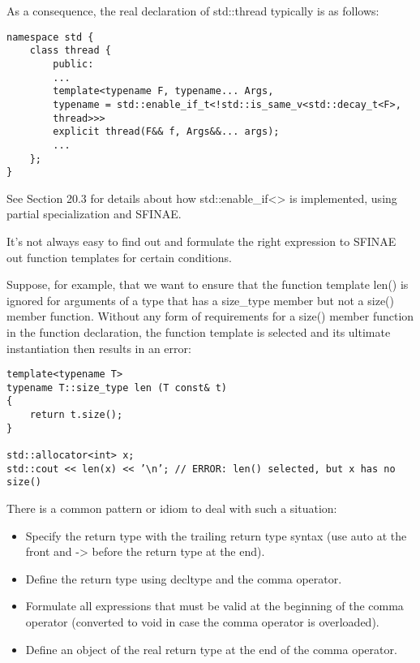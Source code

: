 As a consequence, the real declaration of std::thread typically is as follows:

\begin{lstlisting}[style=styleCXX]
namespace std {
	class thread {
		public:
		...
		template<typename F, typename... Args,
		typename = std::enable_if_t<!std::is_same_v<std::decay_t<F>,
		thread>>>
		explicit thread(F&& f, Args&&... args);
		...
	};
}
\end{lstlisting}

See Section 20.3 for details about how std::enable\_if<> is implemented, using partial specialization and SFINAE.



It’s not always easy to find out and formulate the right expression to SFINAE out function templates for certain conditions.

Suppose, for example, that we want to ensure that the function template len() is ignored for arguments of a type that has a size\_type member but not a size() member function. Without any form of requirements for a size() member function in the function declaration, the function template is selected and its ultimate instantiation then results in an error:

\begin{lstlisting}[style=styleCXX]
template<typename T>
typename T::size_type len (T const& t)
{
	return t.size();
}

std::allocator<int> x;
std::cout << len(x) << ’\n’; // ERROR: len() selected, but x has no size()
\end{lstlisting}

There is a common pattern or idiom to deal with such a situation:

\begin{itemize}
\item 
Specify the return type with the trailing return type syntax (use auto at the front and -> before the return type at the end).

\item 
Define the return type using decltype and the comma operator.

\item 
Formulate all expressions that must be valid at the beginning of the comma operator (converted to void in case the comma operator is overloaded).

\item 
Define an object of the real return type at the end of the comma operator.
\end{itemize}

